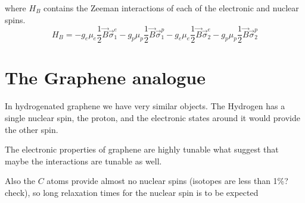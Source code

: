 where $H_B$ contains the Zeeman interactions of each of the electronic and nuclear spins.
\begin{equation}
  H_B = -g_e\mu_e\frac{1}{2}\vec{B}\vec{\sigma}^e_1
      -g_p\mu_p\frac{1}{2}\vec{B}\vec{\sigma}^p_1
      -g_e\mu_e\frac{1}{2}\vec{B}\vec{\sigma}^e_2
      -g_p\mu_p\frac{1}{2}\vec{B}\vec{\sigma}^p_2
\end{equation}



\section{The Graphene analogue}
In hydrogenated graphene we have very similar objects. The Hydrogen has a single nuclear spin, the proton, and the electronic states around it would provide the other spin.

The electronic properties of graphene are highly tunable what suggest that maybe the interactions are tunable as well.

Also the $C$ atoms provide almost no nuclear spins (isotopes are less than 1\%? check), so long relaxation times for the nuclear spin is to be expected


